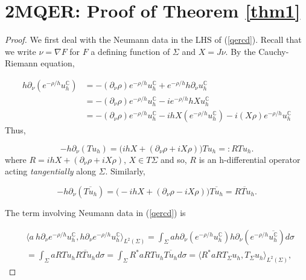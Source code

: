\documentclass[11pt,reqno]{amsart}
\theoremstyle{definition}
\begin{document}
\section{2MQER: Proof of Theorem \ref{thm1}} \label{2mqer}
\begin{proof}

  

We first deal with the Neumann data in the LHS of (\ref{qercd}). Recall that we write $\nu=\nabla F$ for $F$ a defining function of $\Sigma$ and $X=J\nu$. By the Cauchy-Riemann equation,

\begin{align*}
    h\partial_{\nu}(e^{-\rho/h}u^{\mathbb{C}}_h)&=-(\partial_{\nu}\rho)e^{-\rho/h}u^{\mathbb{C}}_h+e^{-\rho/h}h\partial_{\nu}u^{\mathbb{C}}_h\\
    &=-(\partial_{\nu}\rho)e^{-\rho/h}u^{\mathbb{C}}_h-ie^{-\rho/h}hXu^{\mathbb{C}}_h\\
    &=-(\partial_{\nu}\rho)e^{-\rho/h}u^{\mathbb{C}}_h-ihX(e^{-\rho/h}u^{\mathbb{C}}_h) -  i(X\rho)e^{-\rho/h}u^{\mathbb{C}}_h
\end{align*}
Thus,


\begin{equation}\label{R}
-h\partial_{\nu}(Tu_h)=\Big(ihX+(\partial_{\nu}\rho+ iX\rho)\Big)Tu_h=:RTu_h.    
\end{equation}
where $R = ihX+(\partial_{\nu}\rho
+ iX\rho)$,  $X \in T\Sigma$ and so, $R$ is an h-differential operator acting  {\em tangentially} along $\Sigma.$ Similarly,

\begin{equation*}
-h\partial_{\nu}(\overline{Tu_h})=\Big(-ihX+(\partial_{\nu}\rho- iX\rho)\Big)\overline{Tu_h}=\overline{RTu_h}.    
\end{equation*}

The term involving Neumann data in (\ref{qercd}) is 

\begin{equation}\label{Neumann}
\begin{split}
&\langle a~h\partial_{\nu}e^{-\rho/h}u_h^{\mathbb{C}},h\partial_{\nu}e^{-\rho/h}u_h^{\mathbb{C}}\rangle_{L^2(\Sigma)}=\int_{\Sigma}ah\partial_{\nu}(e^{-\rho/h}u^{\mathbb{C}}_h)h\partial_{\nu}(e^{-\rho/h}\overline{u^{\mathbb{C}}_h})d\sigma\\
&=\int_{\Sigma}aRTu_h\overline{RTu_h}d\sigma
=\int_{\Sigma}R^*aRTu_h\overline{Tu_h}d\sigma
=\langle R^*aRT_{\Sigma}u_h,T_{\Sigma}u_h\rangle_{L^2(\Sigma)},
\end{split}
\end{equation}


\end{proof}
\end{document}
